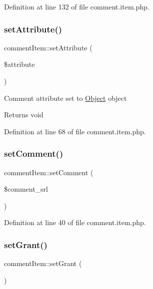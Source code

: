 Definition at line 132 of file comment.\+item.\+php.

\mbox{\label{classcommentItem_a7bc40cf7b410d4ee4a4b1e978f172d06}} 
\subsubsection{\texorpdfstring{set\+Attribute()}{setAttribute()}}
{\footnotesize\ttfamily comment\+Item\+::set\+Attribute (\begin{DoxyParamCaption}\item[{}]{\$attribute }\end{DoxyParamCaption})}

Comment attribute set to \hyperlink{classObject}{Object} object \begin{DoxyReturn}{Returns}
void 
\end{DoxyReturn}


Definition at line 68 of file comment.\+item.\+php.

\mbox{\label{classcommentItem_a98724f23e262a80b73355f5b25f9c2b0}} 
\subsubsection{\texorpdfstring{set\+Comment()}{setComment()}}
{\footnotesize\ttfamily comment\+Item\+::set\+Comment (\begin{DoxyParamCaption}\item[{}]{\$comment\+\_\+srl }\end{DoxyParamCaption})}



Definition at line 40 of file comment.\+item.\+php.

\mbox{\label{classcommentItem_a340fd95c5c60a6e2791c73cb59119d38}} 
\subsubsection{\texorpdfstring{set\+Grant()}{setGrant()}}
{\footnotesize\ttfamily comment\+Item\+::set\+Grant (\begin{DoxyParamCaption}{ }\end{DoxyParamCaption})}



